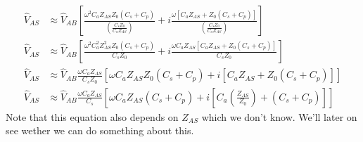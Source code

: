 \begin{eqnarray}
	\hat{V}_{AS} &\approx \hat{V}_{AB}\left[\frac{\omega^2 C_a Z_{AS} Z_0(C_s + C_p)}{(\frac{C_s Z_0}{C_a Z_{AS}})} + i\frac{\omega  \left[C_a Z_{AS} + Z_0(C_s + C_p)\right]}{(\frac{C_s Z_0}{C_a Z_{AS}})}\right]\\
	\hat{V}_{AS} &\approx \hat{V}_{AB}\left[\frac{\omega^2 C_a^2 Z_{AS}^2 Z_0(C_s + C_p)}{C_s Z_0} + i\frac{\omega C_a Z_{AS} \left[C_a Z_{AS} + Z_0(C_s + C_p)\right]}{C_s Z_0}\right]\\
	\hat{V}_{AS} &\approx \hat{V}_{AB}\frac{\omega C_a Z_{AS}}{C_s Z_0}\left[\omega C_a Z_{AS} Z_0(C_s + C_p) + i\left[C_a Z_{AS} + Z_0(C_s + C_p)\right]\right]\\
	\hat{V}_{AS} &\approx \hat{V}_{AB}\frac{\omega C_a Z_{AS}}{C_s}\left[\omega C_a Z_{AS} (C_s + C_p) + i\left[C_a \left(\frac{Z_{AS}}{Z_0}\right) + (C_s + C_p)\right]\right]
	\label{eqn:AS_phasor}
\end{eqnarray}
Note that this equation also depends on $Z_{AS}$ which we don't know.
We'll later on see wether we can do something about this.
\newpage
